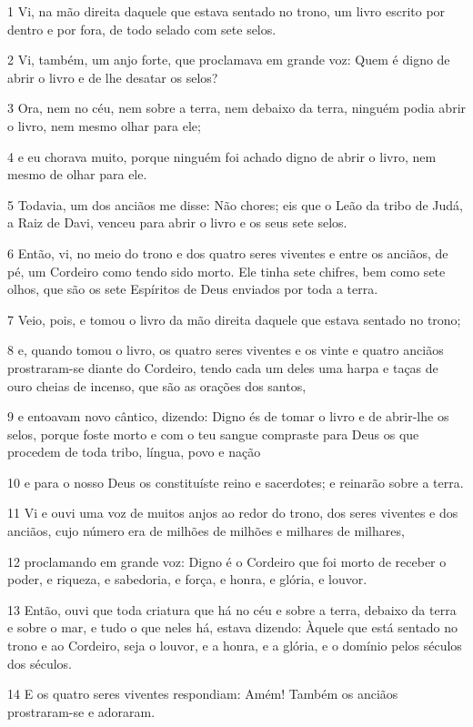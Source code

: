 \par 1 Vi, na mão direita daquele que estava sentado no trono, um livro escrito por dentro e por fora, de todo selado com sete selos.
\par 2 Vi, também, um anjo forte, que proclamava em grande voz: Quem é digno de abrir o livro e de lhe desatar os selos?
\par 3 Ora, nem no céu, nem sobre a terra, nem debaixo da terra, ninguém podia abrir o livro, nem mesmo olhar para ele;
\par 4 e eu chorava muito, porque ninguém foi achado digno de abrir o livro, nem mesmo de olhar para ele.
\par 5 Todavia, um dos anciãos me disse: Não chores; eis que o Leão da tribo de Judá, a Raiz de Davi, venceu para abrir o livro e os seus sete selos.
\par 6 Então, vi, no meio do trono e dos quatro seres viventes e entre os anciãos, de pé, um Cordeiro como tendo sido morto. Ele tinha sete chifres, bem como sete olhos, que são os sete Espíritos de Deus enviados por toda a terra.
\par 7 Veio, pois, e tomou o livro da mão direita daquele que estava sentado no trono;
\par 8 e, quando tomou o livro, os quatro seres viventes e os vinte e quatro anciãos prostraram-se diante do Cordeiro, tendo cada um deles uma harpa e taças de ouro cheias de incenso, que são as orações dos santos,
\par 9 e entoavam novo cântico, dizendo: Digno és de tomar o livro e de abrir-lhe os selos, porque foste morto e com o teu sangue compraste para Deus os que procedem de toda tribo, língua, povo e nação
\par 10 e para o nosso Deus os constituíste reino e sacerdotes; e reinarão sobre a terra.
\par 11 Vi e ouvi uma voz de muitos anjos ao redor do trono, dos seres viventes e dos anciãos, cujo número era de milhões de milhões e milhares de milhares,
\par 12 proclamando em grande voz: Digno é o Cordeiro que foi morto de receber o poder, e riqueza, e sabedoria, e força, e honra, e glória, e louvor.
\par 13 Então, ouvi que toda criatura que há no céu e sobre a terra, debaixo da terra e sobre o mar, e tudo o que neles há, estava dizendo: Àquele que está sentado no trono e ao Cordeiro, seja o louvor, e a honra, e a glória, e o domínio pelos séculos dos séculos.
\par 14 E os quatro seres viventes respondiam: Amém! Também os anciãos prostraram-se e adoraram.

